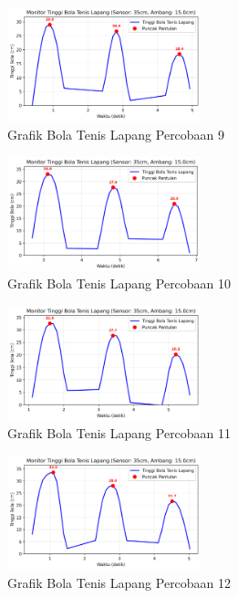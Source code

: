 \begin{figure}[htbp]
    \centering
    \includegraphics[width=0.5\textwidth]{chapters/DataPercobaan/Grafik_Bola_Tenis_Lapang_9.png}
    \caption{Grafik Bola Tenis Lapang Percobaan 9}
\end{figure}
\begin{figure}[htbp]
    \centering
    \includegraphics[width=0.5\textwidth]{chapters/DataPercobaan/Grafik_Bola_Tenis_Lapang_10.png}
    \caption{Grafik Bola Tenis Lapang Percobaan 10}
\end{figure}
\begin{figure}[htbp]
    \centering
    \includegraphics[width=0.5\textwidth]{chapters/DataPercobaan/Grafik_Bola_Tenis_Lapang_11.png}
    \caption{Grafik Bola Tenis Lapang Percobaan 11}
\end{figure}
\begin{figure}[htbp]
    \centering
    \includegraphics[width=0.5\textwidth]{chapters/DataPercobaan/Grafik_Bola_Tenis_Lapang_12.png}
    \caption{Grafik Bola Tenis Lapang Percobaan 12}
\end{figure}
